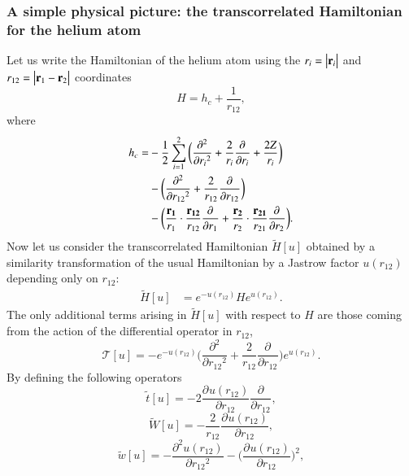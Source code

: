 \documentclass[aip,jcp,reprint,noshowkeys,superscriptaddress]{revtex4-1}
\newcommand{\deriv}[3]{\frac{\partial^{#3} #1}{\partial {#2}^{#3}}}
\newcommand{\bd}[1]{{\bf {#1}}}
\begin{document}
\subsubsection{A simple physical picture: the transcorrelated Hamiltonian for the helium atom}
\label{sec:he_htilde}
Let us write the Hamiltonian of the helium atom using the $r_i = \big|{\bf r}_i\big|$ and $ r_{12} = \big|{\bf r}_1 - {\bf r}_2 \big|$ coordinates  
\begin{equation}
 H  = h_c + \frac{1}{r_{12}},
\end{equation}
where 
\begin{equation}
 \begin{aligned}
 \label{def:h_c}
 h_c = &-\frac{1}{2} \sum_{i=1}^2 \bigg(\deriv{}{r_i}{2} + \frac{2}{r_i} \deriv{}{r_i}{} + \frac{2 Z}{r_i}\bigg) \\
     &-\bigg( \deriv{}{r_{12}}{2} + \frac{2}{r_{12}} \deriv{}{r_{12}}{} \bigg) \\
     &-\bigg( \frac{\bd{r_1}}{r_1} \cdot \frac{\bd{r_{12}} }{r_{12}}  \deriv{}{r_1}{} + 
                \frac{\bd{r_2}}{r_2} \cdot \frac{\bd{r_{21}} }{r_{21}}  \deriv{}{r_2}{} \bigg).
 \end{aligned}
\end{equation}
\label{sec:he_j}
Now let us consider the transcorrelated Hamiltonian $\tilde{H}[u]$ obtained by a similarity transformation of the usual Hamiltonian by a Jastrow factor $u(r_{12})$ depending only on $r_{12}$: 
\begin{equation}
 \label{eq:ht_0}
 \begin{aligned}
 \tilde{H}[u]&= e^{-u(r_{12})} H e^{u(r_{12})}.
 \end{aligned}
\end{equation}
The only additional terms arising in $\tilde{H}[u]$ with respect to $H$ are those coming from the action of the differential operator in $r_{12}$,
\begin{equation}
 \mathcal{T}[u] =  -e^{-u(r_{12})}\bigg( \deriv{}{r_{12}}{2} + \frac{2}{r_{12}} \deriv{}{r_{12}}{} \bigg)e^{u(r_{12})}.  
\end{equation}
By defining the following operators 
\begin{equation}
 \label{eq:def_tt}
 \tilde{t}[u] = -2 \deriv{u(r_{12})}{r_{12}}{} \deriv{}{r_{12}}{},
\end{equation}
\begin{equation}
 \label{eq:def_wt}
 \tilde{W}[u] = -\frac{2}{r_{12}} \deriv{u(r_{12})}{r_{12}}{}  , 
\end{equation}
\begin{equation}
 \label{eq:def_wt}
 \tilde{w}[u] = -\deriv{u(r_{12})}{r_{12}}{2} - \bigg( \deriv{u(r_{12})}{r_{12}}{} \bigg)^2, 
\end{equation}
\end{document}
